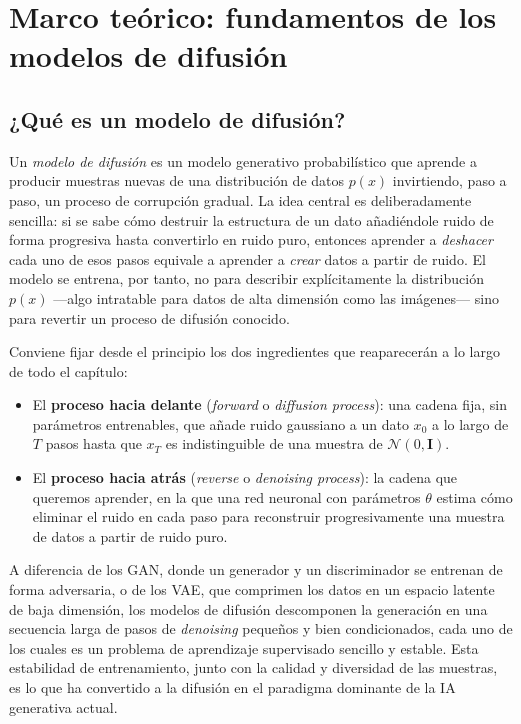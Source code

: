 \chapter{Marco teórico: fundamentos de los modelos de difusión}
\label{cap:marco-teorico}

\section{¿Qué es un modelo de difusión?}
\label{sec:que-es-difusion}

Un \emph{modelo de difusión} es un modelo generativo probabilístico
que aprende a producir muestras nuevas de una distribución de datos
$p(x)$ invirtiendo, paso a paso, un proceso de corrupción gradual.
La idea central es deliberadamente sencilla: si se sabe cómo destruir
la estructura de un dato añadiéndole ruido de forma progresiva hasta
convertirlo en ruido puro, entonces aprender a \emph{deshacer} cada
uno de esos pasos equivale a aprender a \emph{crear} datos a partir de
ruido. El modelo se entrena, por tanto, no para describir
explícitamente la distribución $p(x)$ —algo intratable para datos de
alta dimensión como las imágenes— sino para revertir un proceso de
difusión conocido.

Conviene fijar desde el principio los dos ingredientes que
reaparecerán a lo largo de todo el capítulo:

\begin{itemize}
    \item El \textbf{proceso hacia delante} (\textit{forward} o
    \textit{diffusion process}): una cadena fija, sin parámetros
    entrenables, que añade ruido gaussiano a un dato $x_0$ a lo largo
    de $T$ pasos hasta que $x_T$ es indistinguible de una muestra de
    $\mathcal{N}(0,\mathbf{I})$.
    \item El \textbf{proceso hacia atrás} (\textit{reverse} o
    \textit{denoising process}): la cadena que queremos aprender, en
    la que una red neuronal con parámetros $\theta$ estima cómo
    eliminar el ruido en cada paso para reconstruir progresivamente
    una muestra de datos a partir de ruido puro.
\end{itemize}

A diferencia de los GAN, donde un generador y un discriminador se
entrenan de forma adversaria, o de los VAE, que comprimen los datos
en un espacio latente de baja dimensión, los modelos de difusión
descomponen la generación en una secuencia larga de pasos de
\emph{denoising} pequeños y bien condicionados, cada uno de los cuales
es un problema de aprendizaje supervisado sencillo y estable. Esta
estabilidad de entrenamiento, junto con la calidad y diversidad de las
muestras, es lo que ha convertido a la difusión en el paradigma
dominante de la IA generativa actual.

